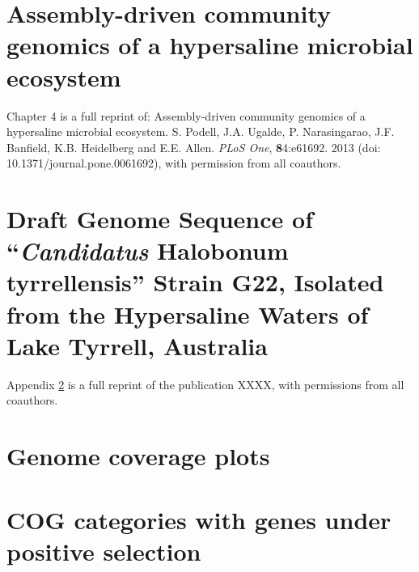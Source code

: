 \documentclass[12pt,chapterheads]{ucsd}
\begin{document}
\chapter{Assembly-driven community genomics of a hypersaline microbial ecosystem}

Chapter 4 is a full reprint of: Assembly-driven community genomics of a hypersaline microbial ecosystem. S. Podell, J.A. Ugalde, P. Narasingarao, J.F. Banfield, K.B. Heidelberg and E.E. Allen. \textit{PLoS One}, \textbf{8}4:e61692. 2013 (doi: 10.1371/journal.pone.0061692), with permission from all coauthors.



%






\appendix

\chapter{Draft Genome Sequence of “\textit{Candidatus} Halobonum tyrrellensis” Strain G22, Isolated from the Hypersaline Waters of Lake Tyrrell, Australia}\label{G22Genome}

Appendix \ref{G22Genome} is a full reprint of the publication XXXX, with permissions from all coauthors.

\chapter{Genome coverage plots}


\chapter{COG categories with genes under positive selection}


%

\listoftodos


\end{document}
